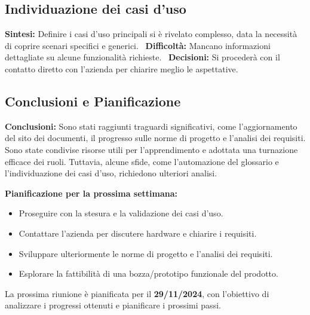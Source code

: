 \documentclass{article}
\newcommand{\isEsterno}{0}
\begin{document}
\subsection{Individuazione dei casi d'uso} \textbf{Sintesi:} Definire i casi d’uso principali si è rivelato complesso, data la necessità di coprire scenari specifici e generici. \ \textbf{Difficoltà:} Mancano informazioni dettagliate su alcune funzionalità richieste. \ \textbf{Decisioni:} Si procederà con il contatto diretto con l'azienda per chiarire meglio le aspettative.

\subsection*{Conclusioni e Pianificazione} \textbf{Conclusioni:} Sono stati raggiunti traguardi significativi, come l’aggiornamento del sito dei documenti, il progresso sulle norme di progetto e l’analisi dei requisiti. Sono state condivise risorse utili per l’apprendimento e adottata una turnazione efficace dei ruoli. Tuttavia, alcune sfide, come l’automazione del glossario e l’individuazione dei casi d’uso, richiedono ulteriori analisi.

\textbf{Pianificazione per la prossima settimana:} \begin{itemize} \item Proseguire con la stesura e la validazione dei casi d’uso. \item Contattare l’azienda per discutere hardware e chiarire i requisiti. \item Sviluppare ulteriormente le norme di progetto e l’analisi dei requisiti. \item Esplorare la fattibilità di una bozza/prototipo funzionale del prodotto. \end{itemize}

La prossima riunione è pianificata per il \textbf{29/11/2024}, con l'obiettivo di analizzare i progressi ottenuti e pianificare i prossimi passi.



\ifthenelse{\equal{\isEsterno}{1}}{
    \begin{table}[b]
        \begin{tabular}{@{}p{.5in}p{4in}@{}}
            Data:  & \hrulefill \\
                   &     		\\
                   &     		\\
            Firma: & \hrulefill \\
        \end{tabular}
        \end{table}
}{}
\end{document}
